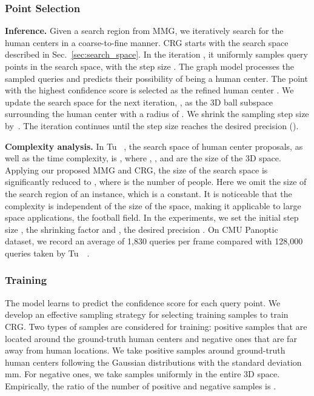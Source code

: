 \documentclass[10pt,twocolumn,letterpaper]{article}
\begin{document}
\subsubsection{Point Selection}
\label{sec:point_selection}

\textbf{Inference.} Given a search region from MMG, we iteratively search for the human centers in a coarse-to-fine manner. CRG starts with the search space  described in Sec.~\ref{sec:search_space}. In the iteration , it uniformly samples query points in the search space, with the step size . The graph model processes the sampled queries and predicts their possibility of being a human center. The point with the highest confidence score is selected as the refined human center . We update the search space for the next iteration, , as the 3D ball subspace surrounding the human center  with a radius of . We shrink the sampling step size by~\ie . The iteration continues until the step size reaches the desired precision ().

\textbf{Complexity analysis.}
In Tu \etal~\cite{tu2020voxelpose}, the search space of human center proposals, as well as the time complexity, is , where , , and  are the size of the 3D space. Applying our proposed MMG and CRG, the size of the search space is significantly reduced to , where  is the number of people. Here we omit the size of the search region of an instance, which is a constant. It is noticeable that the complexity is independent of the size of the space, making it applicable to large space applications, \eg the football field. In the experiments, we set the initial step size , the shrinking factor  and , the desired precision . On CMU Panoptic ~\cite{joo2017panoptic} dataset, we record an average of 1,830 queries per frame compared with 128,000 queries taken by Tu~\etal~\cite{tu2020voxelpose}. 


\subsubsection{Training} 

The model learns to predict the confidence score for each query point. We develop an effective sampling strategy for selecting training samples to train CRG. Two types of samples are considered for training: positive samples that are located around the ground-truth human centers and negative ones that are far away from human locations. We take positive samples around ground-truth human centers following the Gaussian distributions with the standard deviation mm. For negative ones, we take samples uniformly in the entire 3D space. Empirically, the ratio of the number of positive and negative samples is .
\end{document}
